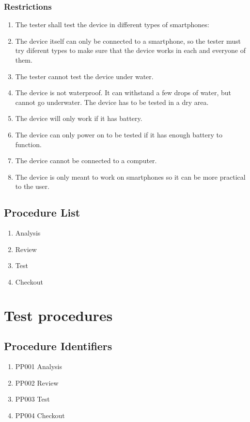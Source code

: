\documentclass{scrreprt}
\begin{document}
\subsection{Restrictions}
\begin{enumerate}
    \item The tester shall test the device in different types of smartphones:
    \item The device itself can only be connected to a smartphone, so the tester must try diferent types to make sure that the device works in each and everyone of them.
    \item The tester cannot test the device under water.
    \item The device is not waterproof. It can withstand a few drops of water, but cannot go underwater. The device has to be tested in a dry area.
    \item The device will only work if it has battery.
    \item The device can only power on to be tested if it has enough battery to function.
    \item The device cannot be connected to a computer.
    \item The device is only meant to work on smartphones so it can be more practical to the user.
\end{enumerate}

\section{Procedure List}
\begin{enumerate}
    \item Analysis
    \item Review 
    \item Test
    \item Checkout
\end{enumerate}

\chapter{Test procedures}
\section{Procedure Identifiers}
\begin{enumerate}
    \item PP001 Analysis
    \item PP002 Review
    \item PP003 Test
    \item PP004 Checkout
\end{enumerate}
\end{document}
